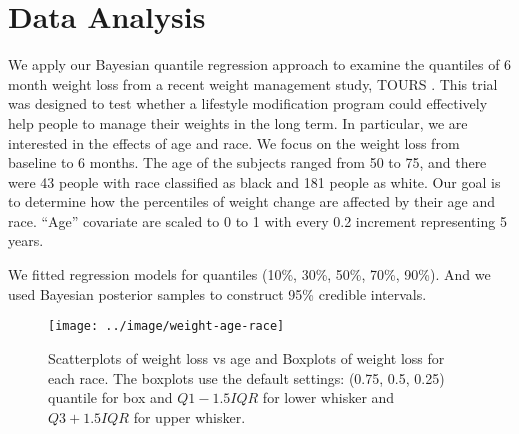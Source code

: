 \documentclass[12pt]{article}
\begin{document}
\section{Data Analysis}
\label{ch2:sec:tours}
We apply our Bayesian quantile regression approach to
examine the quantiles of 6 month weight loss from a recent weight
management study, TOURS \citep{perri2008extended}.  This trial was designed
to test whether a lifestyle modification program could effectively
help people to manage their weights in the long term.  In particular,
we are interested in the effects of age and race.  We focus on the
weight loss from baseline to 6 months. The age of the subjects ranged
from 50 to 75, and there were 43 people with race classified as black
and 181 people as white.  Our goal is to determine how the percentiles
of weight change are affected by their age and race.  ``Age''
covariate are scaled to 0 to 1 with every 0.2 increment representing 5
years.

We fitted regression models for quantiles (10\%, 30\%, 50\%, 70\%,
90\%). And we used Bayesian posterior samples to construct 95\%
credible intervals.

\begin{figure}[htbp]
  \centerline{\texttt{[image: ../image/weight-age-race]}}
  \caption[]{\label{ch2:fig:tours} Scatterplots of weight loss vs age and
    Boxplots of weight loss for each race.  The boxplots use the
    default settings: (0.75, 0.5, 0.25) quantile for box and
    $Q1-1.5IQR$ for lower whisker and $Q3+1.5IQR$ for upper whisker. }
\end{figure}
\end{document}
